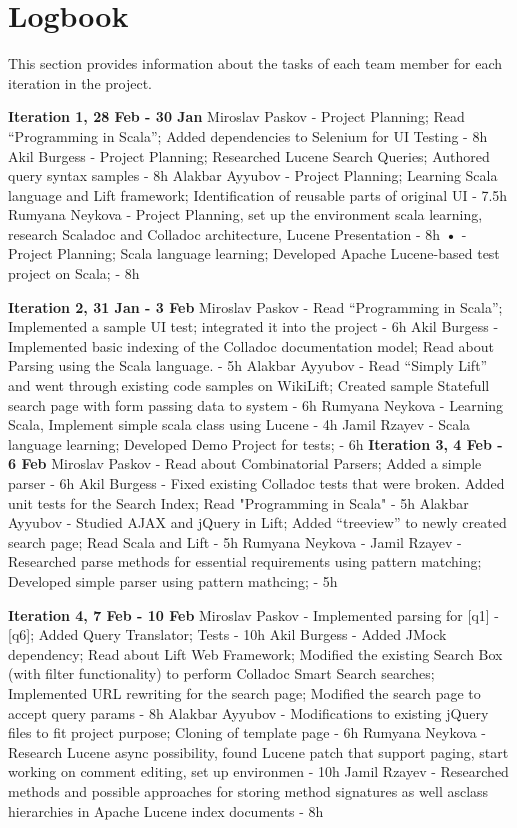 \section{Logbook}\label{sec:logbook}
This section provides information about the tasks of each team member for each iteration in the project. 

\textbf{Iteration 1, 28 Feb - 30 Jan}
Miroslav Paskov - Project Planning; Read “Programming in Scala”; Added dependencies to Selenium for UI Testing - 8h
Akil Burgess - Project Planning; Researched Lucene Search Queries; Authored query syntax samples - 8h
Alakbar Ayyubov - Project Planning; Learning Scala language and Lift framework; Identification of reusable parts of original UI - 7.5h
Rumyana Neykova - Project Planning, set up the environment scala learning, research Scaladoc and Colladoc architecture, Lucene Presentation - 8h
\textbf{•} - Project Planning; Scala language learning; Developed Apache Lucene-based test project on Scala; - 8h

\textbf{Iteration 2, 31 Jan - 3 Feb}
Miroslav Paskov - Read “Programming in Scala”; Implemented a sample UI test; integrated it into the project - 6h
Akil Burgess - Implemented basic indexing of the Colladoc documentation model; Read about Parsing using the Scala language. - 5h
Alakbar Ayyubov - Read “Simply Lift” and went through existing code samples on WikiLift; Created sample Statefull search page with form passing data to system - 6h
Rumyana Neykova - Learning Scala, Implement simple scala class using Lucene - 4h 
Jamil Rzayev - Scala language learning; Developed Demo Project for tests; - 6h
\textbf{Iteration 3, 4 Feb - 6 Feb}
Miroslav Paskov - Read about Combinatorial Parsers; Added a simple parser  - 6h
Akil Burgess - Fixed existing Colladoc tests that were broken. Added unit tests for the Search Index; Read "Programming in Scala" - 5h
Alakbar Ayyubov - Studied AJAX and jQuery in Lift; Added “treeview” to newly created search page; Read Scala and Lift - 5h
Rumyana Neykova - 
Jamil Rzayev - Researched parse methods for essential requirements using pattern matching; Developed simple parser using pattern mathcing; - 5h

\textbf{Iteration 4, 7 Feb - 10 Feb}
Miroslav Paskov - Implemented parsing for [q1] - [q6]; Added Query Translator; Tests - 10h
Akil Burgess - Added JMock dependency; Read about Lift Web Framework; Modified the existing Search Box (with filter functionality) to perform Colladoc Smart Search searches; Implemented URL rewriting for the search page; Modified the search page to accept query params - 8h  
Alakbar Ayyubov -  Modifications to existing jQuery files to fit project purpose; Cloning of template page - 6h 
Rumyana Neykova - Research Lucene async possibility, found Lucene patch that support paging,  start working on comment editing, set up environmen - 10h
Jamil Rzayev - Researched methods and possible approaches for storing method signatures as well asclass hierarchies in Apache Lucene index documents - 8h

